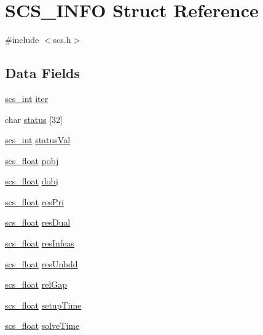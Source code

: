 \hypertarget{struct_s_c_s___i_n_f_o}{\section{S\-C\-S\-\_\-\-I\-N\-F\-O Struct Reference}
\label{struct_s_c_s___i_n_f_o}
}


{\ttfamily \#include $<$scs.\-h$>$}

\subsection*{Data Fields}
\begin{DoxyCompactItemize}
\item 
\hyperlink{glbopts_8h_a23c48a83ce0c58783595ad45ffcaf76b}{scs\-\_\-int} \hyperlink{struct_s_c_s___i_n_f_o_aaa3efcaf3c4249211456e089d0ab5796}{iter}
\item 
char \hyperlink{struct_s_c_s___i_n_f_o_ac79351c93fe44f38bd52330cabadbc3b}{status} \mbox{[}32\mbox{]}
\item 
\hyperlink{glbopts_8h_a23c48a83ce0c58783595ad45ffcaf76b}{scs\-\_\-int} \hyperlink{struct_s_c_s___i_n_f_o_ae6e5ecc65a6c58d8ae4c8ee2f83af4e1}{status\-Val}
\item 
\hyperlink{glbopts_8h_ad37836e6404bb2c3ae8adcc6290699b9}{scs\-\_\-float} \hyperlink{struct_s_c_s___i_n_f_o_a80ca822f2a561f1dc4251b75a52d4167}{pobj}
\item 
\hyperlink{glbopts_8h_ad37836e6404bb2c3ae8adcc6290699b9}{scs\-\_\-float} \hyperlink{struct_s_c_s___i_n_f_o_acce78aa146a6dc96bc793c5aa089ffa0}{dobj}
\item 
\hyperlink{glbopts_8h_ad37836e6404bb2c3ae8adcc6290699b9}{scs\-\_\-float} \hyperlink{struct_s_c_s___i_n_f_o_a1af95dd458f4e9075efbbee55f24edc4}{res\-Pri}
\item 
\hyperlink{glbopts_8h_ad37836e6404bb2c3ae8adcc6290699b9}{scs\-\_\-float} \hyperlink{struct_s_c_s___i_n_f_o_a6191ab7805b585f711a7ef5b0498d4df}{res\-Dual}
\item 
\hyperlink{glbopts_8h_ad37836e6404bb2c3ae8adcc6290699b9}{scs\-\_\-float} \hyperlink{struct_s_c_s___i_n_f_o_a70d241dfc725cac8d8a57cb749ab6c18}{res\-Infeas}
\item 
\hyperlink{glbopts_8h_ad37836e6404bb2c3ae8adcc6290699b9}{scs\-\_\-float} \hyperlink{struct_s_c_s___i_n_f_o_a0bbc7fd744d7d8f18d5d205b28097914}{res\-Unbdd}
\item 
\hyperlink{glbopts_8h_ad37836e6404bb2c3ae8adcc6290699b9}{scs\-\_\-float} \hyperlink{struct_s_c_s___i_n_f_o_a8956058c7a50430e03efd62b2dfbce72}{rel\-Gap}
\item 
\hyperlink{glbopts_8h_ad37836e6404bb2c3ae8adcc6290699b9}{scs\-\_\-float} \hyperlink{struct_s_c_s___i_n_f_o_a256bf2cabb2fef250de553e378898306}{setup\-Time}
\item 
\hyperlink{glbopts_8h_ad37836e6404bb2c3ae8adcc6290699b9}{scs\-\_\-float} \hyperlink{struct_s_c_s___i_n_f_o_abf921434213a047f2abc2a47feca54e8}{solve\-Time}
\end{DoxyCompactItemize}


